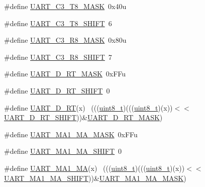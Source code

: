 \begin{DoxyCompactItemize}
\item 
\#define \hyperlink{group___u_a_r_t___register___masks_gaec915ed2882cf21feb385399e44b5a9b}{U\+A\+R\+T\+\_\+\+C3\+\_\+\+T8\+\_\+\+M\+A\+SK}~0x40u
\item 
\#define \hyperlink{group___u_a_r_t___register___masks_ga98e310521d3edf56770be85701a65142}{U\+A\+R\+T\+\_\+\+C3\+\_\+\+T8\+\_\+\+S\+H\+I\+FT}~6
\item 
\#define \hyperlink{group___u_a_r_t___register___masks_gae17bda6e18ad786d2cedf0105976d9dc}{U\+A\+R\+T\+\_\+\+C3\+\_\+\+R8\+\_\+\+M\+A\+SK}~0x80u
\item 
\#define \hyperlink{group___u_a_r_t___register___masks_gab1799b4eb595a66cc5995e206e001f78}{U\+A\+R\+T\+\_\+\+C3\+\_\+\+R8\+\_\+\+S\+H\+I\+FT}~7
\item 
\#define \hyperlink{group___u_a_r_t___register___masks_gabb8507803e62ff2f8cc3a3c7f9fc43c2}{U\+A\+R\+T\+\_\+\+D\+\_\+\+R\+T\+\_\+\+M\+A\+SK}~0x\+F\+Fu
\item 
\#define \hyperlink{group___u_a_r_t___register___masks_ga045cb82177942d68eb711a61ee412768}{U\+A\+R\+T\+\_\+\+D\+\_\+\+R\+T\+\_\+\+S\+H\+I\+FT}~0
\item 
\#define \hyperlink{group___u_a_r_t___register___masks_ga4f5ba4e9a327cd6730693568463e8d67}{U\+A\+R\+T\+\_\+\+D\+\_\+\+RT}(x)                                                      ~(((\hyperlink{_p_e___types_8h_aba7bc1797add20fe3efdf37ced1182c5}{uint8\+\_\+t})(((\hyperlink{_p_e___types_8h_aba7bc1797add20fe3efdf37ced1182c5}{uint8\+\_\+t})(x))$<$$<$\hyperlink{group___u_a_r_t___register___masks_ga045cb82177942d68eb711a61ee412768}{U\+A\+R\+T\+\_\+\+D\+\_\+\+R\+T\+\_\+\+S\+H\+I\+FT}))\&\hyperlink{group___u_a_r_t___register___masks_gabb8507803e62ff2f8cc3a3c7f9fc43c2}{U\+A\+R\+T\+\_\+\+D\+\_\+\+R\+T\+\_\+\+M\+A\+SK})
\item 
\#define \hyperlink{group___u_a_r_t___register___masks_gaa4fe1e60d0ca635fd633af77c3b63998}{U\+A\+R\+T\+\_\+\+M\+A1\+\_\+\+M\+A\+\_\+\+M\+A\+SK}~0x\+F\+Fu
\item 
\#define \hyperlink{group___u_a_r_t___register___masks_ga878daa0e87ec3da2299c223b6b234976}{U\+A\+R\+T\+\_\+\+M\+A1\+\_\+\+M\+A\+\_\+\+S\+H\+I\+FT}~0
\item 
\#define \hyperlink{group___u_a_r_t___register___masks_ga0f6a921bbc9dffba69c13c0b19b70f49}{U\+A\+R\+T\+\_\+\+M\+A1\+\_\+\+MA}(x)                                                  ~(((\hyperlink{_p_e___types_8h_aba7bc1797add20fe3efdf37ced1182c5}{uint8\+\_\+t})(((\hyperlink{_p_e___types_8h_aba7bc1797add20fe3efdf37ced1182c5}{uint8\+\_\+t})(x))$<$$<$\hyperlink{group___u_a_r_t___register___masks_ga878daa0e87ec3da2299c223b6b234976}{U\+A\+R\+T\+\_\+\+M\+A1\+\_\+\+M\+A\+\_\+\+S\+H\+I\+FT}))\&\hyperlink{group___u_a_r_t___register___masks_gaa4fe1e60d0ca635fd633af77c3b63998}{U\+A\+R\+T\+\_\+\+M\+A1\+\_\+\+M\+A\+\_\+\+M\+A\+SK})

\end{DoxyCompactItemize}

